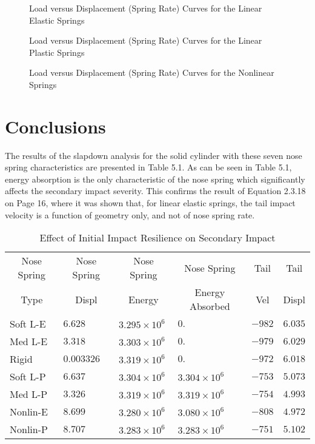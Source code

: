 \begin{figure}
\vspace{3.5 in}
\caption{Load versus Displacement (Spring Rate) Curves for the Linear 
Elastic Springs}
\end{figure}

\begin{figure}
\vspace{3.5 in}
\caption{Load versus Displacement (Spring Rate) Curves for the Linear
Plastic Springs}
\end{figure}

\begin{figure}
\vspace{3.5 in}
\caption{Load versus Displacement (Spring Rate) Curves for the 
Nonlinear Springs}
\end{figure}

\section{Conclusions}

     The results of the slapdown analysis for the 
solid cylinder with these
seven nose spring characteristics are presented in Table 5.1.  As can
be seen in Table 5.1, energy absorption is the only characteristic of
the nose spring which significantly affects the secondary impact
severity.  This confirms the result of Equation 2.3.18 on Page 16, 
where it was shown that, for linear elastic springs, the tail impact 
velocity is 
a function of geometry only, and not of nose spring rate.

\begin{table}
\begin{center}
\caption{Effect of Initial Impact Resilience on Secondary Impact}
\begin{tabular}{||l|l|l|l|l|l||}
\hline
\multicolumn{1}{||c}{Nose Spring}
&\multicolumn{1}{|c}{Nose Spring}
&\multicolumn{1}{|c}{Nose Spring}
&\multicolumn{1}{|c}{Nose Spring}
&\multicolumn{1}{|c}{Tail}
&\multicolumn{1}{|c||}{Tail}\\
\multicolumn{1}{||c}{Type}
&\multicolumn{1}{|c}{Displ}
&\multicolumn{1}{|c}{Energy}
&\multicolumn{1}{|c}{Energy Absorbed}
&\multicolumn{1}{|c}{Vel}
&\multicolumn{1}{|c||}{Displ}\\
\hline
Soft L-E &$6.628$ &$3.295\times10^6$ &$0.$ &$-982$ &$6.035$\\
Med L-E  &$3.318$ &$3.303\times10^6$ &$0.$ &$-979$ &$6.029$\\
Rigid    &$0.003326$ &$3.319\times10^6$ &$0.$ &$-972$ &$6.018$\\
Soft L-P &$6.637$ &$3.304\times10^6$ &$3.304\times10^6$ &$-753$ &$5.073$\\
Med L-P  &$3.326$ &$3.319\times10^6$ &$3.319\times10^6$ &$-754$ &$4.993$\\
Nonlin-E &$8.699$ &$3.280\times10^6$ &$3.080\times10^6$ &$-808$ &$4.972$\\
Nonlin-P &$8.707$ &$3.283\times10^6$ &$3.283\times10^6$ &$-751$ &$5.102$\\
\hline
\end{tabular}
\end{center}
\end{table}

